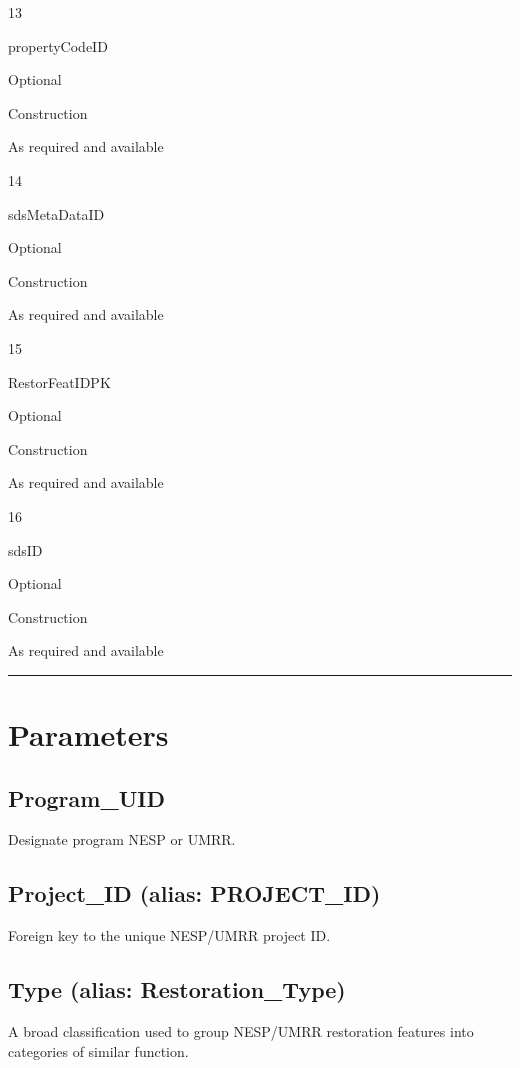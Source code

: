 \documentclass[
  letterpaper,
  DIV=11,
  numbers=noendperiod]{scrreprt}
\begin{document}
13

propertyCodeID

Optional

Construction

As required and available

14

sdsMetaDataID

Optional

Construction

As required and available

15

RestorFeatIDPK

Optional

Construction

As required and available

16

sdsID

Optional

Construction

As required and available

\begin{center}\rule{0.5\linewidth}{0.5pt}\end{center}

\section{Parameters}\label{parameters-19}

\subsection{Program\_UID}\label{program_uid-19}

Designate program NESP or UMRR.

\subsection{Project\_ID (alias:
PROJECT\_ID)}\label{project_id-alias-project_id-19}

Foreign key to the unique NESP/UMRR project ID.

\subsection{Type (alias:
Restoration\_Type)}\label{type-alias-restoration_type}

A broad classification used to group NESP/UMRR restoration features into
categories of similar function.
\end{document}

